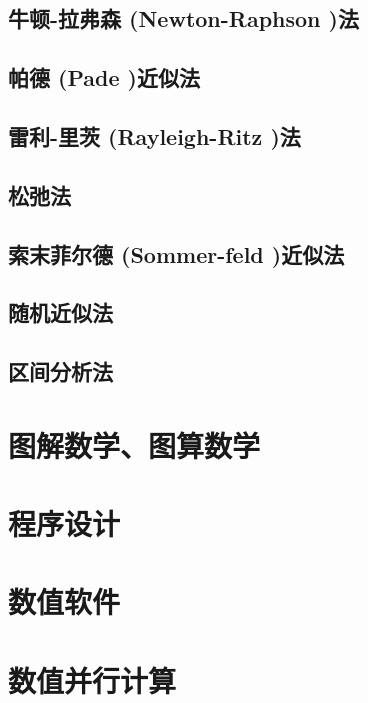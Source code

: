 \documentclass[UTF8]{../09-Mathematics}
\begin{document}
\section{牛顿-拉弗森 (Newton-Raphson )法}




\section{帕德 (Pade )近似法}
\section{雷利-里茨 (Rayleigh-Ritz )法}
\section{松弛法}
\section{索末菲尔德 (Sommer-feld )近似法}
\section{随机近似法}
\section{区间分析法}



\chapter{图解数学、图算数学}
\chapter{程序设计}
\chapter{数值软件}
\chapter{数值并行计算}
\end{document}

